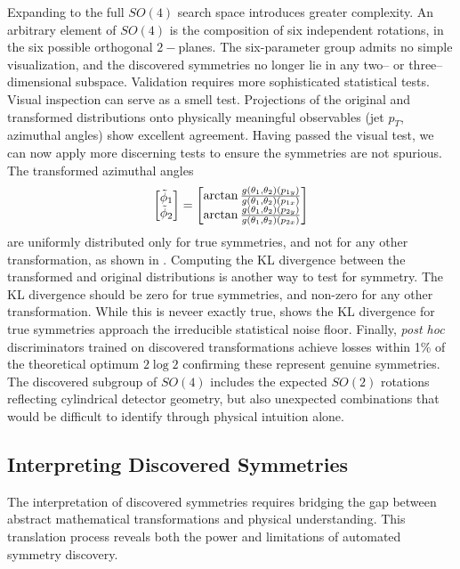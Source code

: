             Expanding to the full \(SO(4)\) search space introduces greater complexity.
            An arbitrary element of \(SO(4)\) is the composition of six independent rotations, in the six possible orthogonal \(2-\)planes.
            The six-parameter group admits no simple visualization, and the discovered symmetries no longer lie in any two-- or three--dimensional subspace.
            Validation requires more sophisticated statistical tests.
            Visual inspection can serve as a smell test.
            Projections of the original and transformed distributions onto physically meaningful observables (jet \(p_T\), azimuthal angles) show excellent agreement.
            Having passed the visual test, we can now apply more discerning tests to ensure the symmetries are not spurious.
            The transformed azimuthal angles
            \[
                \mqty[\tilde{\phi}_1\\\tilde{\phi}_2] = \mqty[
                    \arctan \frac{g(\theta_1, \theta_2)(p_{1y})}{g(\theta_1, \theta_2)(p_{1x})} \\
                    \arctan \frac{g(\theta_1, \theta_2)(p_{2y})}{g(\theta_1, \theta_2)(p_{2x})}
                ]
            \]
            are uniformly distributed only for true symmetries, and not for any other transformation, as shown in .
            Computing the KL divergence between the transformed and original distributions is another way to test for symmetry.
            The KL divergence should be zero for true symmetries, and non-zero for any other transformation.
            While this is neveer exactly true,  shows the KL divergence for true symmetries approach the irreducible statistical noise floor.
            Finally, \textit{post hoc} discriminators trained on discovered transformations achieve losses within 1\% of the theoretical optimum \(2\log 2\) confirming these represent genuine symmetries.
            The discovered subgroup of \(SO(4)\) includes the expected \(SO(2)\) rotations reflecting cylindrical detector geometry, but also unexpected combinations that would be difficult to identify through physical intuition alone.
            
        \subsection{Interpreting Discovered Symmetries}
            The interpretation of discovered symmetries requires bridging the gap between abstract mathematical transformations and physical understanding.
            This translation process reveals both the power and limitations of automated symmetry discovery.
            
